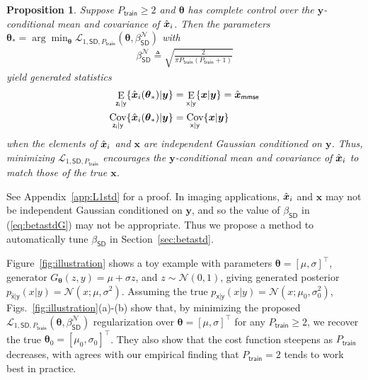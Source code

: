 \documentclass{article}
\theoremstyle{plain}
\newtheorem{proposition}[theorem]{Proposition}
\theoremstyle{definition}
\theoremstyle{remark}
\renewcommand{\hat}{\widehat}
\newcommand{\defn}{\triangleq}
\newcommand{\hvec}[1]{\ensuremath{\Hat{\boldsymbol{#1}}}}
\renewcommand{\vec}[1]{\ensuremath{\boldsymbol{#1}}}
\newcommand{\mc}[1]{\ensuremath{\mathcal{#1}}}
\newcommand{\tran}{^{\top}}
\DeclareMathOperator{\E}{E}
\DeclareMathOperator{\Cov}{Cov}
\renewcommand{\eqref}[1]{(\ref{eq:#1})}
\newcommand{\Figref}[1]{Figure~\ref{fig:#1}}
\newcommand{\secref}[1]{Section~\ref{sec:#1}}
\newcommand{\appref}[1]{Appendix~\ref{app:#1}}
\newcommand{\mmse}{_{\mathsf{mmse}}}
\newcommand{\pxgy}{p_{\mathsf{x}|\mathsf{y}}}
\newcommand{\pxhgy}{p_{\hat{\mathsf{x}}|\mathsf{y}}}
\newcommand{\Exgy}{\E_{\mathsf{x}|\mathsf{y}}}
\newcommand{\Ezigy}{\E_{\mathsf{z_i}|\mathsf{y}}}
\newcommand{\Covzigy}{\Cov_{\mathsf{z_i}|\mathsf{y}}}
\newcommand{\Covxgy}{\Cov_{\mathsf{x}|\mathsf{y}}}
\newcommand{\train}{_{\mathsf{train}}}
\newcommand{\LonestdPt}{\mc{L}_{1,\mathsf{SD},P\train}}
\newcommand{\betastd}{\beta_{\mathsf{SD}}}
\newcommand{\betastdG}{\beta_{\mathsf{SD}}^\mc{N}}
\begin{document}
\begin{proposition} \label{prop:L1std}
Suppose $P\train\geq 2$ and $\vec{\theta}$ has complete control over the $\vec{y}$-conditional mean and covariance of $\hvec{x}_i$.
Then the parameters
$\vec{\theta}_* = \arg\min_{\vec{\theta}} \LonestdPt(\vec{\theta},\betastdG)$ with
\begin{align}
\textstyle \betastdG \defn \sqrt{\frac{2}{\pi P\train(P\train+1)}}
\label{eq:betastdG}
\end{align}
yield generated statistics
\begin{subequations}\label{eq:goal}
\begin{align}
\Ezigy\{\hvec{x}_i(\vec{\theta}_*)|\vec{y}\} &= \Exgy\{\vec{x}|\vec{y}\} = \hvec{x}\mmse \\
\Covzigy\{\hvec{x}_i(\vec{\theta}_*)|\vec{y}\} &= \Covxgy\{\vec{x}|\vec{y}\}
\end{align}
\end{subequations}
when the elements of $\hvec{x}_i$ and $\vec{x}$ are independent Gaussian conditioned on $\vec{y}$.
Thus, minimizing $\LonestdPt$ encourages the $\vec{y}$-conditional mean and covariance of $\hvec{x}_i$ to match those of the true $\vec{x}$.  
\end{proposition}

See \appref{L1std} for a proof.
In imaging applications, $\hvec{x}_i$ and $\vec{x}$ may not be independent Gaussian conditioned on $\vec{y}$, and so the value of $\betastd$ in \eqref{betastdG} may not be appropriate. 
Thus we propose a method to automatically tune $\betastd$ in \secref{betastd}. 

\Figref{illustration} shows a toy example with 
parameters $\vec{\theta}=[\mu,\sigma]\tran$,
generator $G_{\vec{\theta}}(z,y)=\mu+\sigma z$, 
and $z\sim\mc{N}(0,1)$, giving generated posterior
$\pxhgy(x|y)=\mc{N}(x;\mu,\sigma^2)$.
Assuming the true $\pxgy(x|y)=\mc{N}(x;\mu_0,\sigma_0^2)$,
Figs.~\ref{fig:illustration}(a)-(b) show that, by minimizing the proposed $\LonestdPt(\vec{\theta},\betastdG)$ regularization over $\vec{\theta}=[\mu,\sigma]\tran$ for any $P\train\geq 2$, we recover the true $\vec{\theta}_0=[\mu_0,\sigma_0]\tran$.
They also show that the cost function steepens as $P\train$ decreases, with agrees with our empirical finding that $P\train=2$ tends to work best in practice.
\end{document}
